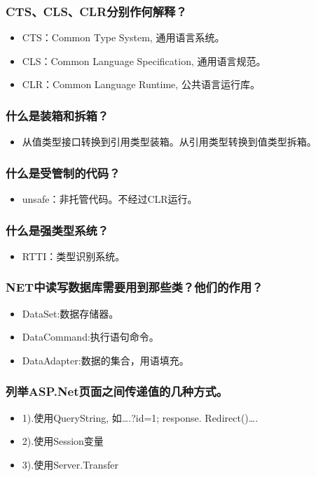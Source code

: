 \documentclass[9pt, b5paper]{article}
\begin{document}
\subsubsection{CTS、CLS、CLR分别作何解释？}
\label{sec-1-1-15}
\begin{itemize}
\item CTS：Common Type System, 通用语言系统。
\item CLS：Common Language Specification, 通用语言规范。
\item CLR：Common Language Runtime, 公共语言运行库。
\end{itemize}
\subsubsection{什么是装箱和拆箱？}
\label{sec-1-1-16}
\begin{itemize}
\item 从值类型接口转换到引用类型装箱。从引用类型转换到值类型拆箱。
\end{itemize}
\subsubsection{什么是受管制的代码？}
\label{sec-1-1-17}
\begin{itemize}
\item unsafe：非托管代码。不经过CLR运行。
\end{itemize}
\subsubsection{什么是强类型系统？}
\label{sec-1-1-18}
\begin{itemize}
\item RTTI：类型识别系统。
\end{itemize}
\subsubsection{NET中读写数据库需要用到那些类？他们的作用？}
\label{sec-1-1-19}
\begin{itemize}
\item DataSet:数据存储器。
\item DataCommand:执行语句命令。
\item DataAdapter:数据的集合，用语填充。
\end{itemize}
\subsubsection{列举ASP.Net页面之间传递值的几种方式。}
\label{sec-1-1-20}
\begin{itemize}
\item 1).使用QueryString, 如\ldots{}.?id=1; response. Redirect()\ldots{}.
\item 2).使用Session变量
\item 3).使用Server.Transfer
\end{itemize}
\end{document}
